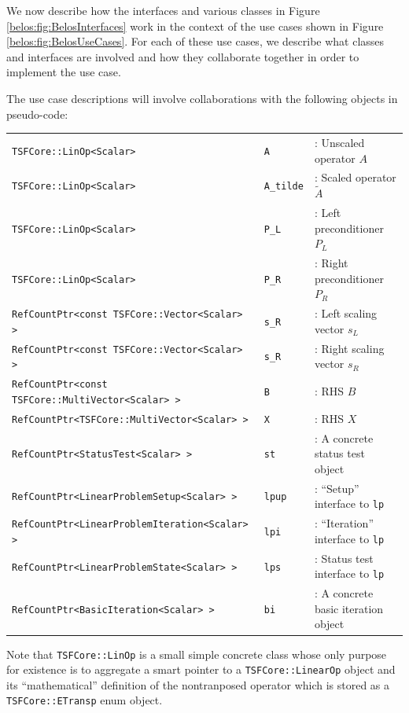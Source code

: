 \documentclass[pdf,ps2pdf,11pt]{SANDreport}
\begin{document}
We now describe how the interfaces and various classes in Figure
{}\ref{belos:fig:BelosInterfaces} work in the context of the use cases
shown in Figure {}\ref{belos:fig:BelosUseCases}.  For each of these
use cases, we describe what classes and interfaces are involved and
how they collaborate together in order to implement the use case.

The use case descriptions will involve collaborations with the
following objects in pseudo-code:

\begin{tabular}{lll}
{\small\texttt{TSFCore::LinOp<Scalar>}} & {\small\texttt{A}} & : Unscaled operator $A$ \\
{\small\texttt{TSFCore::LinOp<Scalar>}} & {\small\texttt{A\_tilde}} & : Scaled operator $\tilde{A}$ \\
{\small\texttt{TSFCore::LinOp<Scalar>}} & {\small\texttt{P\_L}} & : Left preconditioner $P_L$ \\
{\small\texttt{TSFCore::LinOp<Scalar>}} & {\small\texttt{P\_R}} & : Right preconditioner $P_R$ \\
{\small\texttt{RefCountPtr<const TSFCore::Vector<Scalar> >}} & {\small\texttt{s\_R}} & : Left scaling vector $s_L$ \\
{\small\texttt{RefCountPtr<const TSFCore::Vector<Scalar> >}} & {\small\texttt{s\_R}} & : Right scaling vector $s_R$ \\
{\small\texttt{RefCountPtr<const TSFCore::MultiVector<Scalar> >}} & {\small\texttt{B}} & : RHS $B$ \\
{\small\texttt{RefCountPtr<TSFCore::MultiVector<Scalar> >}} & {\small\texttt{X}} & : RHS $X$ \\
{\small\texttt{RefCountPtr<StatusTest<Scalar> >}} & {\small\texttt{st}} & : A concrete status test object  \\
{\small\texttt{RefCountPtr<LinearProblemSetup<Scalar> >}} & {\small\texttt{lpup}} & : ``Setup'' interface to {}\texttt{lp} \\
{\small\texttt{RefCountPtr<LinearProblemIteration<Scalar> >}} & {\small\texttt{lpi}} & : ``Iteration'' interface to  {}\texttt{lp} \\
{\small\texttt{RefCountPtr<LinearProblemState<Scalar> >}} & {\small\texttt{lps}} & : Status test interface to  {}\texttt{lp} \\
{\small\texttt{RefCountPtr<BasicIteration<Scalar> >}} & {\small\texttt{bi}} & : A concrete basic iteration object
\end{tabular}

Note that {}\texttt{TSFCore::\-LinOp} is a small simple concrete class
whose only purpose for existence is to aggregate a smart pointer to a
{}\texttt{TSFCore::\-Linear\-Op} object and its ``mathematical''
definition of the nontranposed operator which is stored as a
{}\texttt{TSFCore::\-ETransp} enum object.
\end{document}
